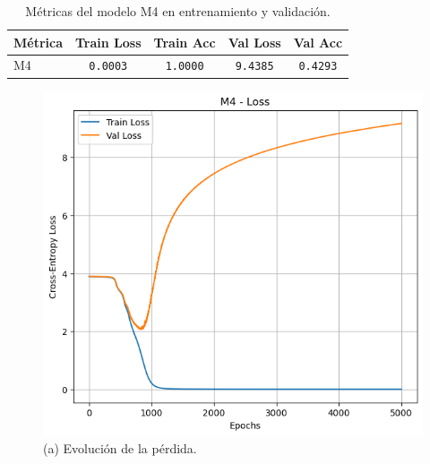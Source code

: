 \documentclass[11pt]{article}
\begin{document}
\begin{table}[H]
    \centering
    \begin{tabular}{lcccc}
        \hline
        Métrica & Train Loss & Train Acc & Val Loss & Val Acc \\
        \hline
        M4 & \texttt{0.0003} & \texttt{1.0000} & \texttt{9.4385} & \texttt{0.4293} \\
        \hline
    \end{tabular}
    \caption{Métricas del modelo M4 en entrenamiento y validación.}
    \label{tab:metrics-m4}
\end{table}

\begin{figure}[H]
    \centering
    \begin{minipage}[t]{0.32\textwidth}
        \centering
        \includegraphics[width=\linewidth]{figures/loss_m4.png}
        \caption*{(a) Evolución de la pérdida.}
    \end{minipage}
    \hfill
    \begin{minipage}[t]{0.32\textwidth}
        \centering

\end{minipage}
\end{figure}
\end{document}
